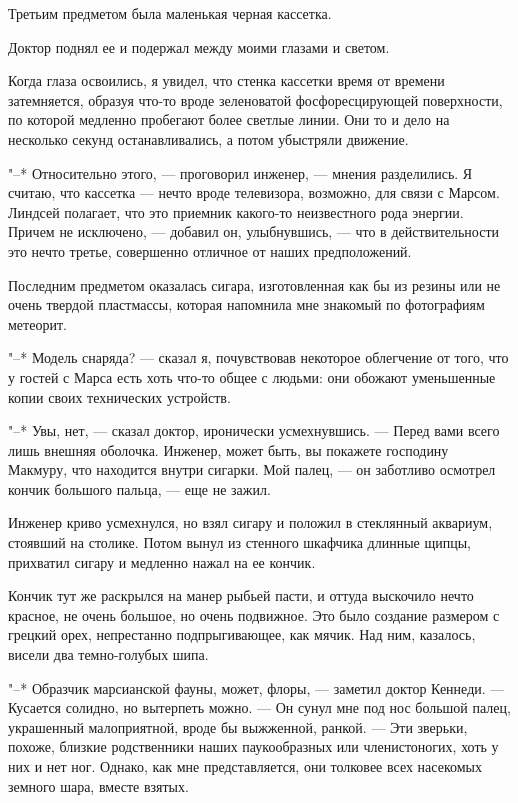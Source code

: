Третьим предметом была маленькая черная кассетка.

Доктор поднял ее и подержал между моими глазами и светом.

Когда глаза освоились, я увидел, что стенка кассетки время  от  времени
затемняется,   образуя   что-то   вроде    зеленоватой    фосфоресцирующей
поверхности, по которой медленно пробегают более светлые линии. Они  то  и
дело на несколько секунд останавливались, а потом убыстряли движение.

"--* Относительно этого, --- проговорил инженер,  ---  мнения  разделились.  Я
считаю, что кассетка --- нечто  вроде  телевизора,  возможно,  для  связи  с
Марсом. Линдсей полагает, что это  приемник  какого-то  неизвестного  рода
энергии.  Причем  не  исключено,  ---  добавил  он,  улыбнувшись,  ---  что  в
действительности  это  нечто  третье,   совершенно   отличное   от   наших
предположений.

Последним предметом оказалась сигара, изготовленная как  бы  из  резины
или не  очень  твердой  пластмассы,  которая  напомнила  мне  знакомый  по
фотографиям метеорит.

"--* Модель снаряда? --- сказал  я,  почувствовав  некоторое  облегчение  от
того, что у гостей с Марса есть хоть что-то общее с  людьми:  они  обожают
уменьшенные копии своих технических устройств.

"--* Увы, нет, --- сказал доктор,  иронически  усмехнувшись.  ---  Перед  вами
всего лишь внешняя оболочка. Инженер, может быть,  вы  покажете  господину
Макмуру, что находится внутри сигарки. Мой палец, --- он заботливо  осмотрел
кончик большого пальца, --- еще не зажил.

Инженер криво  усмехнулся,  но  взял  сигару  и  положил  в  стеклянный
аквариум, стоявший на столике. Потом вынул из  стенного  шкафчика  длинные
щипцы, прихватил сигару и медленно нажал на ее кончик.

Кончик тут же раскрылся на манер рыбьей пасти, и оттуда выскочило нечто
красное, не очень большое, но очень подвижное. Это было создание  размером
с грецкий орех, непрестанно подпрыгивающее, как мячик. Над ним,  казалось,
висели два темно-голубых шипа.

"--* Образчик марсианской фауны, может, флоры, --- заметил доктор Кеннеди. ---
Кусается солидно, но вытерпеть можно. ---  Он  сунул  мне  под  нос  большой
палец, украшенный малоприятной, вроде бы выжженной, ранкой. --- Эти зверьки,
похоже, близкие родственники наших паукообразных или членистоногих, хоть у
них и нет ног. Однако, как мне представляется, они толковее всех насекомых
земного шара, вместе взятых.


